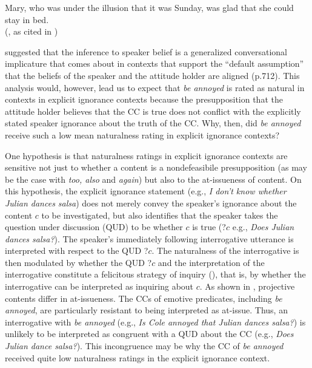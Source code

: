 \documentclass[11pt,fleqn]{article}
\newcommand{\6}{\mbox{$[\hspace*{-.6mm}[$}}
\newcommand{\9}{\mbox{$]\hspace*{-.6mm}]$}}
\begin{document}
\begin{exe}
\ex\label{emo} 
Mary, who was under the illusion that it was Sunday, was glad that she could stay in bed. \\ \hspace*{.2cm} \hfill (\citealt{klein1975}, as cited in \citealt[122]{gazdar79a})
\end{exe}
\citealt{karttunen2016} suggested that the inference to speaker belief is a generalized conversational implicature that comes about in contexts that support the ``default assumption'' that the beliefs of the speaker and the attitude holder are aligned (p.712). This analysis would, however, lead us to expect that {\em be annoyed} is rated as natural in contexts in explicit ignorance contexts because the presupposition that the attitude holder believes that the CC is true does not conflict with the explicitly stated speaker ignorance about the truth of the CC. Why, then, did {\em be annoyed} receive such a low mean naturalness rating in explicit ignorance contexts? 

One hypothesis is that naturalness ratings in explicit ignorance contexts are sensitive not just to whether a content is a nondefeasibile presupposition (as may be the case with {\em too, also} and {\em again}) but also to the at-issueness of content. On this hypothesis, the explicit ignorance statement (e.g., {\em I don't know whether Julian dances salsa}) does not merely convey the speaker's ignorance about the content $c$ to be investigated, but also identifies that the speaker takes the question under discussion (QUD) to be whether $c$ is true (?$c$ e.g., {\em Does Julian dances salsa?}). The speaker's immediately following interrogative utterance is interpreted with respect to the QUD ?$c$. The naturalness of the interrogative is then modulated by whether the QUD ?$c$  and the interpretation of the interrogative constitute a felicitous strategy of inquiry (\citealt[32f.]{roberts12}), that is,  by whether the interrogative can be interpreted as inquiring about $c$. As shown in \citealt{tbd-variability}, projective contents differ in at-issueness. The CCs of emotive predicates, including {\em be annoyed}, are particularly resistant to being interpreted as at-issue. Thus, an interrogative with {\em be annoyed} (e.g., {\em Is Cole annoyed that Julian dances salsa?}) is unlikely to be interpreted as congruent with a QUD about the CC (e.g., {\em Does Julian dance salsa?}). This incongruence may be why the CC of {\em be annoyed} received quite low naturalness ratings in the explicit ignorance context.
\end{document}
